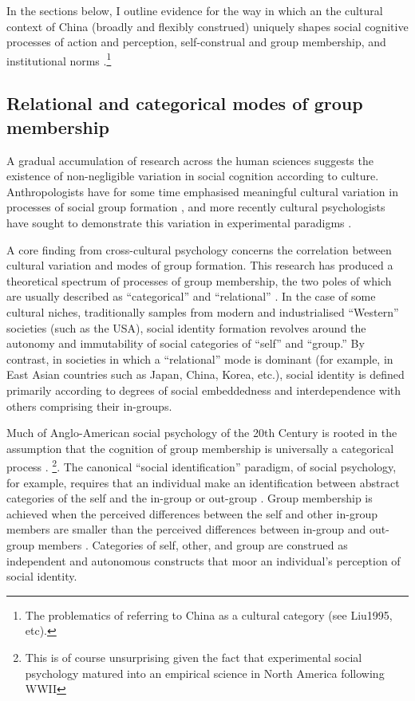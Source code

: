 \begin{CJK}{UTF8}{gbsn}
In the sections below, I outline evidence for the way in which an the cultural context of China (broadly and flexibly construed) uniquely shapes social cognitive processes of action and perception, self-construal and group membership, and institutional norms \citep{Liu2009}.\footnote{The problematics of referring to China as a cultural category (see Liu1995, etc).}


\subsection{Relational and categorical modes of group membership}

A gradual accumulation of research across the human sciences suggests the existence of non-negligible variation in social cognition according to culture.  Anthropologists have for some time emphasised meaningful cultural variation in processes of social group formation \citep{Strodtbeck1961,Kluckhohn1961,Mead1967,Fei1992}, and more recently cultural psychologists have sought to demonstrate this variation in experimental paradigms \citep{Markus1991,Nisbett2001}.

A core finding from cross-cultural psychology concerns the correlation between cultural variation and modes of group formation.  This research has produced a theoretical spectrum of processes of group membership, the two poles of which are usually described as ``categorical'' and ``relational'' \citep{Hofstede1980,Brewer2007}.  In the case of some cultural niches, traditionally samples from modern and industrialised ``Western'' societies (such as the USA), social identity formation revolves around the autonomy and immutability of social categories of ``self'' and ``group.''  By contrast, in societies in which a ``relational'' mode is dominant (for example, in East Asian countries such as Japan, China, Korea, etc.), social identity is defined primarily according to degrees of social embeddedness and interdependence with others comprising their in-groups\citep{Leung2012}.

Much of Anglo-American social psychology of the 20th Century is rooted in the assumption that the cognition of group membership is universally a categorical process \citep{Liu2005}.
  \footnote{This is of course unsurprising given the fact that experimental social psychology matured into an empirical science in North America following WWII}.
The canonical ``social identification'' paradigm, of social psychology, for example, requires that an individual make an identification between abstract categories of the self and the in-group or out-group \citep{Turner1987}.  Group membership is achieved when the perceived differences between the self and other in-group members are smaller than the perceived differences between in-group and out-group members \citep{Yuki2014}. Categories of self, other, and group are construed as independent and autonomous constructs that moor an individual's perception of social identity.


\end{CJK}
